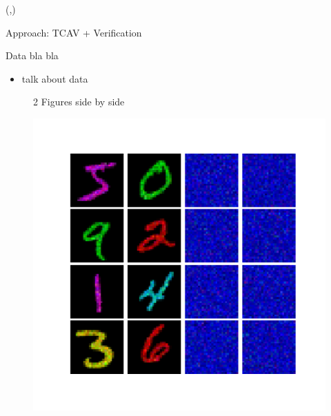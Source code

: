 \documentclass[final]{beamer}
\begin{document}
\begin{frame}[fragile]{}
\begin{textblock}{\colwidth}(\secondcolpos,\vstartCols)
\begin{paddedBlock}{Approach: TCAV + Verification}

\alert{Data bla bla}
  \begin{itemize}
    \item talk about data
  \end{itemize}

\begin{figure}%
    \centering
    \qquad
    \caption{2 Figures side by side}%
    \label{fig:example}%
\end{figure}

\begin{figure}
    \centering
    \includegraphics[width=.2\textwidth]{img/cav_viz}
    \label{fig:big}
\end{figure}


\end{paddedBlock}
\end{textblock}
\end{frame}
\end{document}
